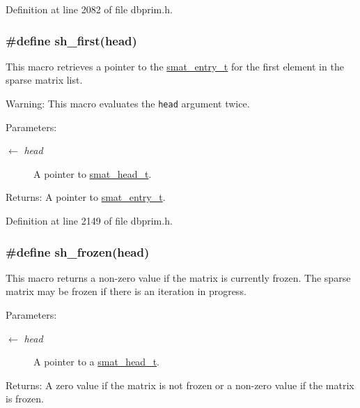 Definition at line 2082 of file dbprim.h.\hypertarget{group__dbprim__smat_ga49}{
\subsubsection[sh\_\-first]{\setlength{\rightskip}{0pt plus 5cm}\#define sh\_\-first(head)}}
\label{group__dbprim__smat_ga49}


This macro retrieves a pointer to the \hyperlink{group__dbprim__smat_ga2}{smat\_\-entry\_\-t} for the first element in the sparse matrix list.

\begin{Desc}
\item[Warning:]This macro evaluates the {\tt head} argument twice.\end{Desc}
\begin{Desc}
\item[Parameters:]
\begin{description}
\item[\mbox{$\leftarrow$} {\em head}]A pointer to \hyperlink{group__dbprim__smat_ga1}{smat\_\-head\_\-t}.\end{description}
\end{Desc}
\begin{Desc}
\item[Returns:]A pointer to \hyperlink{group__dbprim__smat_ga2}{smat\_\-entry\_\-t}.\end{Desc}


Definition at line 2149 of file dbprim.h.\hypertarget{group__dbprim__smat_ga46}{
\subsubsection[sh\_\-frozen]{\setlength{\rightskip}{0pt plus 5cm}\#define sh\_\-frozen(head)}}
\label{group__dbprim__smat_ga46}


This macro returns a non-zero value if the matrix is currently frozen. The sparse matrix may be frozen if there is an iteration in progress.

\begin{Desc}
\item[Parameters:]
\begin{description}
\item[\mbox{$\leftarrow$} {\em head}]A pointer to a \hyperlink{group__dbprim__smat_ga1}{smat\_\-head\_\-t}.\end{description}
\end{Desc}
\begin{Desc}
\item[Returns:]A zero value if the matrix is not frozen or a non-zero value if the matrix is frozen.\end{Desc}



